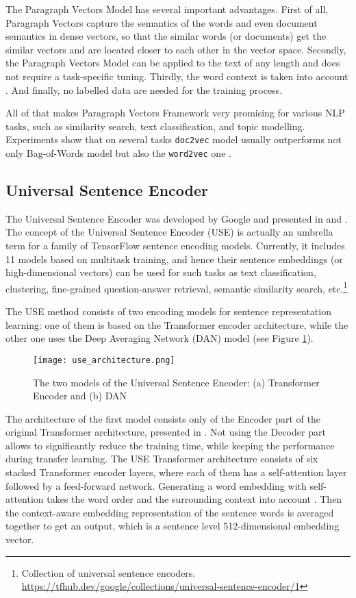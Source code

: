 \documentclass[fontsize=12pt,a4paper,twoside,openany]{scrbook}
\begin{document}
The Paragraph Vectors Model has several important advantages. First of all, Paragraph Vectors capture the semantics of the words and even document semantics in dense vectors, so that the similar words (or documents) get the similar vectors and are located closer to each other in the vector space. Secondly, the Paragraph Vectors Model can be applied to the text of any length and does not require a task-specific tuning. Thirdly, the word context is taken into account \parencite{Dai15}. And finally, no labelled data are needed for the training process. 

All of that makes Paragraph Vectors Framework very promising for various NLP tasks, such as similarity search, text classification, and topic modelling. Experiments show that on several tasks \verb|doc2vec| model usually outperforms not only Bag-of-Words model but also the \verb|word2vec| one \parencite[see][]{Lau16, Le14}.

\subsection{Universal Sentence Encoder}
\label{sec:muse}

The Universal Sentence Encoder was developed by Google and presented in \parencite{Cer18a} and \parencite{Cer18b}. The concept of the Universal Sentence Encoder (USE) is actually an umbrella term for a family of TensorFlow sentence encoding models. Currently, it includes 11 models based on multitask training, and hence their sentence embeddings (or high-dimensional vectors) can be used for such tasks as text classification, clustering,  fine-grained question-answer retrieval, semantic similarity search, etc.\footnote{Collection of universal sentence encoders. \url{https://tfhub.dev/google/collections/universal-sentence-encoder/1}}

The USE method consists of two encoding models for sentence representation learning: one of them is based on the Transformer encoder architecture, while the other one uses the Deep Averaging Network (DAN) model \parencite{Cer18a} (see Figure \ref{fig:use_architecture}).

\begin{figure}[h]
\centering
\texttt{[image: use\_architecture.png]}
\caption{The two models of the Universal Sentence Encoder: (a) Transformer Encoder and (b) DAN}
\label{fig:use_architecture}
\end{figure}

The architecture of the first model consists only of the Encoder part of the original Transformer architecture, presented in \parencite{Vaswani17}. Not using the Decoder part allows to significantly reduce the training time, while keeping the performance during transfer learning. The USE Transformer architecture consists of six stacked Transformer encoder layers, where each of them has a self-attention layer followed by a feed-forward network. Generating a word embedding with self-attention takes the word order and the surrounding context into account \parencite{Cer18a}. Then the context-aware embedding representation of the sentence words is averaged together to get an output, which is a sentence level 512-dimensional embedding vector. 
\end{document}

